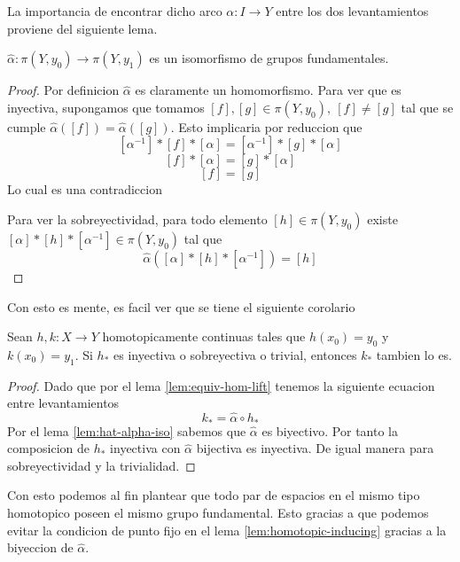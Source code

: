 La importancia de encontrar dicho arco \(\alpha : I \to Y\) entre los
dos levantamientos proviene del siguiente lema.
\begin{lema} \label{lem:hat-alpha-iso}
\(\hat \alpha : \pi (Y, y_0) \to \pi (Y, y_1)\) es un isomorfismo de
grupos fundamentales.
\end{lema}
\begin{proof}
  Por definicion \(\hat \alpha\) es claramente un homomorfismo. Para ver
  que es inyectiva, supongamos que tomamos \([f],[g] \in \pi (Y, y_0),\
  [f] \neq [g]\) tal que se cumple \(\hat \alpha ([f]) = \hat \alpha
  ([g])\). Esto implicaria por reduccion que
  \[ [\alpha^{-1}] * [f] * [\alpha] = [\alpha^{-1}] * [g] * [\alpha] \]
  \[ [f] * [\alpha] = [g] * [\alpha] \]
  \[ [f] = [g] \]
  Lo cual es una contradiccion

  Para ver la sobreyectividad, para todo elemento \([h]
  \in \pi (Y,y_0)\) existe \( [\alpha] * [h] * [\alpha^{-1}] \in \pi
  (Y,y_0)\) tal que
  \[ \hat \alpha ([\alpha] * [h] * [\alpha^{-1}]) = [h]\]
\end{proof}
Con esto es mente, es facil ver que se tiene el siguiente corolario
\begin{corolario}
  Sean \(h,k : X \to Y\) homotopicamente continuas tales que \(h (x_0) =
  y_0\) y \(k(x_0) = y_1\). Si \(h_*\) es inyectiva o sobreyectiva o
  trivial, entonces \(k_*\) tambien lo es.
\end{corolario}
\begin{proof}
  Dado que por el lema \ref{lem:equiv-hom-lift} tenemos la siguiente
  ecuacion entre levantamientos
  \[ k_* = \hat \alpha \circ h_* \]
  Por el lema \ref{lem:hat-alpha-iso} sabemos que \(\hat \alpha\) es
  biyectivo. Por tanto la composicion de \(h_*\) inyectiva con \(\hat
  \alpha\) bijectiva es inyectiva. De igual manera para sobreyectividad y
  la trivialidad.
\end{proof}
Con esto podemos al fin plantear que todo par de espacios en el mismo
tipo homotopico poseen el mismo grupo fundamental. Esto gracias a que
podemos evitar la condicion de punto fijo en el lema
\ref{lem:homotopic-inducing} gracias a la biyeccion de \(\hat \alpha\).

